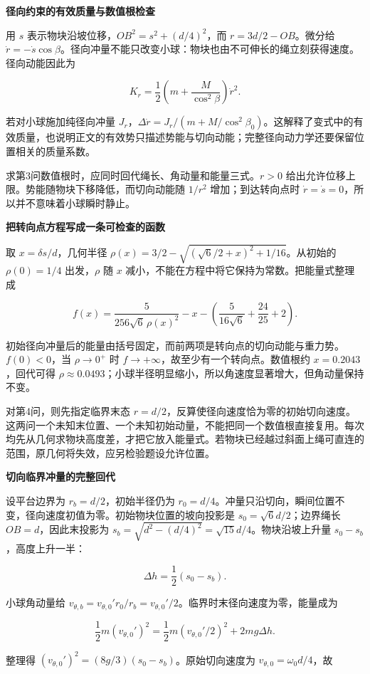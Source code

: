 \documentclass[12pt,a4paper,UTF8]{ctexart}
\begin{document}
\textbf{径向约束的有效质量与数值根检查}

用 \(s\) 表示物块沿坡位移，\(OB^2=s^2+(d/4)^2\)，而
\(r=3d/2-OB\)。微分给
\(\dot r=-\dot s\cos\beta\)。径向冲量不能只改变小球：物块也由不可伸长的绳立刻获得速度。径向动能因此为

\[K_r=\frac12\left(m+\frac{M}{\cos^2\beta}\right)\dot r^2.\]

若对小球施加纯径向冲量
\(J_r\)，\(\Delta\dot r=J_r/(m+M/\cos^2\beta_0)\)。这解释了变式中的有效质量，也说明正文的有效势只描述势能与切向动能；完整径向动力学还要保留位置相关的质量系数。

求第3问数值根时，应同时回代绳长、角动量和能量三式。\(r>0\)
给出允许位移上限。势能随物块下移降低，而切向动能随 \(1/r^2\)
增加；到达转向点时 \(\dot r=\dot s=0\)，所以并不意味着小球瞬时静止。

\textbf{把转向点方程写成一条可检查的函数}

取 \(x=\delta s/d\)，几何半径
\(\rho(x)=3/2-\sqrt{(\sqrt6/2+x)^2+1/16}\)。从初始的 \(\rho(0)=1/4\)
出发，\(\rho\) 随 \(x\) 减小，不能在方程中将它保持为常数。把能量式整理成

\[f(x)=\frac{5}{256\sqrt6\,\rho(x)^2}-x-\left(\frac{5}{16\sqrt6}+\frac{24}{25}+2\right).\]

初始径向冲量后的能量由括号固定，而前两项是转向点的切向动能与重力势。\(f(0)<0\)，当
\(\rho\to0^+\) 时 \(f\to+\infty\)，故至少有一个转向点。数值根约
\(x=0.2043\)，回代可得
\(\rho\approx0.0493\)；小球半径明显缩小，所以角速度显著增大，但角动量保持不变。

对第4问，则先指定临界末态
\(r=d/2\)，反算使径向速度恰为零的初始切向速度。这两问一个未知末位置、一个未知初始动量，不能把同一个数值根直接复用。每次均先从几何求物块高度差，才把它放入能量式。若物块已经越过斜面上绳可直连的范围，原几何将失效，应另检验题设允许位置。

\textbf{切向临界冲量的完整回代}

设平台边界为 \(r_b=d/2\)，初始半径仍为
\(r_0=d/4\)。冲量只沿切向，瞬间位置不变，径向速度初值为零。初始物块位置的坡向投影是
\(s_0=\sqrt6d/2\)；边界绳长 \(OB=d\)，因此末投影为
\(s_b=\sqrt{d^2-(d/4)^2}=\sqrt{15}d/4\)。物块沿坡上升量
\(s_0-s_b\)，高度上升一半：

\[\Delta h=\frac12(s_0-s_b).\]

小球角动量给
\(v_{\theta,b}=v_{\theta,0}'r_0/r_b=v_{\theta,0}'/2\)。临界时末径向速度为零，能量成为

\[\frac12m(v_{\theta,0}')^2=\frac12m(v_{\theta,0}'/2)^2+2mg\Delta h.\]

整理得 \((v_{\theta,0}')^2=(8g/3)(s_0-s_b)\)。原始切向速度为
\(v_{\theta,0}=\omega_0d/4\)，故
\end{document}
